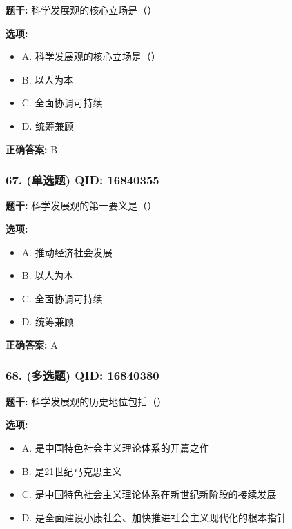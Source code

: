 \documentclass[12pt,UTF8]{ctexart}
\begin{document}
\textbf{题干:}
科学发展观的核心立场是（）

\textbf{选项:}
\begin{itemize}[leftmargin=*]

  \item A. 科学发展观的核心立场是（）

  \item B. 以人为本

  \item C. 全面协调可持续

  \item D. 统筹兼顾

\end{itemize}

\textbf{正确答案:}
B

\vspace{0.3em}\hrulefill\vspace{0.7em}

\subsubsection*{67. (单选题) \small QID: 16840355}

\textbf{题干:}
科学发展观的第一要义是（）

\textbf{选项:}
\begin{itemize}[leftmargin=*]

  \item A. 推动经济社会发展

  \item B. 以人为本

  \item C. 全面协调可持续

  \item D. 统筹兼顾

\end{itemize}

\textbf{正确答案:}
A

\vspace{0.3em}\hrulefill\vspace{0.7em}

\subsubsection*{68. (多选题) \small QID: 16840380}

\textbf{题干:}
科学发展观的历史地位包括（）

\textbf{选项:}
\begin{itemize}[leftmargin=*]

  \item A. 是中国特色社会主义理论体系的开篇之作

  \item B. 是21世纪马克思主义

  \item C. 是中国特色社会主义理论体系在新世纪新阶段的接续发展

  \item D. 是全面建设小康社会、加快推进社会主义现代化的根本指针

\end{itemize}
\end{document}

